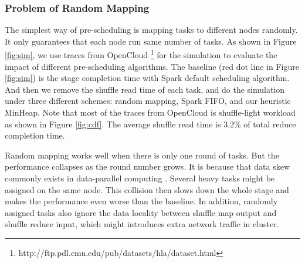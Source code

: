 \subsubsection{Problem of Random Mapping}\label{randomassign}
The simplest way of pre-scheduling is mapping tasks to different nodes randomly. It only guarantees that each node run same number of tasks. 
As shown in Figure \ref{fig:sim}, we use traces from OpenCloud \footnote{\label{fn:trace}http://ftp.pdl.cmu.edu/pub/datasets/hla/dataset.html} for the simulation to evaluate the impact of different pre-scheduling algorithms. The baseline (red dot line in Figure \ref{fig:sim}) is the stage completion time with Spark default scheduling algorithm. And then we remove the shuffle read time of each task, and do the simulation under three different schemes: random mapping, Spark FIFO, and our heuristic MinHeap.
Note that most of the traces from OpenCloud is shuffle-light workload as shown in Figure \ref{fig:cdf}. The average shuffle read time is 3.2\% of total reduce completion time.

Random mapping works well when there is only one round of tasks. But the performance collapses as the round number grows. It is because that data skew commonly exists in data-parallel computing \cite{skewtune, reining, gufler2012load}. Several heavy tasks might be assigned on the same node. This collision then slows down the whole stage and makes the performance even worse than the baseline. In addition, randomly assigned tasks also ignore the data locality between shuffle map output and shuffle reduce input, which might introduces extra network traffic in cluster.

